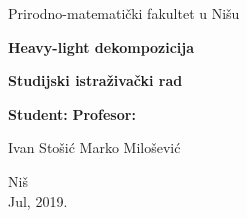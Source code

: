 \begin{titlepage}
\begin{center}
{\large Prirodno-matemati\v cki fakultet u Ni\v su}
\end{center}
\vspace{5cm}
\begin{center}
{\Huge \textbf{Heavy-light dekompozicija}}
\end{center}
\begin{center}
{\large \textbf{Studijski istra\v ziva\v cki rad}}
\end{center}
\vspace{6cm}


\large \textbf{Student:} \hfill \textbf{Profesor:}

\large Ivan Sto\v si\' c \hfill Marko Milo\v sevi\' c

\vspace{2.5cm}
\begin{center}{Ni\v s\\
Jul, 2019.}\end{center}
\end{titlepage}